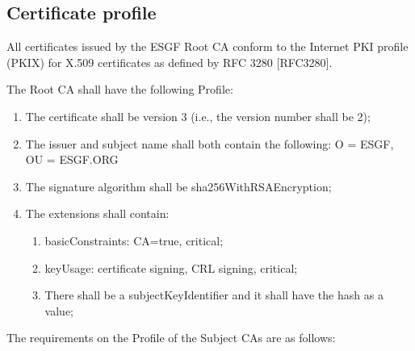 \subsection{Certificate profile}\label{certificate-profile}

All certificates issued by the ESGF Root CA conform to the Internet
PKI profile (PKIX) for X.509 certificates as defined by RFC 3280
{[}RFC3280{]}.

The Root CA shall have the following Profile:

\begin{enumerate}
\item
  
  The certificate shall be version 3 (i.e., the version number shall be
  2);
  
\item
  
  The issuer and subject name shall both contain the following:
O = ESGF, OU = ESGF.ORG 
  
\item
  
  The signature algorithm shall be sha256WithRSAEncryption;
  
\item
  
  The extensions shall contain:
  

  \begin{enumerate}
  \item
    
    basicConstraints: CA=true, critical;
    
  \item
    
    keyUsage: certificate signing, CRL signing, critical;
    
  \item
    
    There shall be a subjectKeyIdentifier and it shall have the hash as a value;
    
  \end{enumerate}
\end{enumerate}

The requirements on the Profile of the Subject CAs are as follows:

